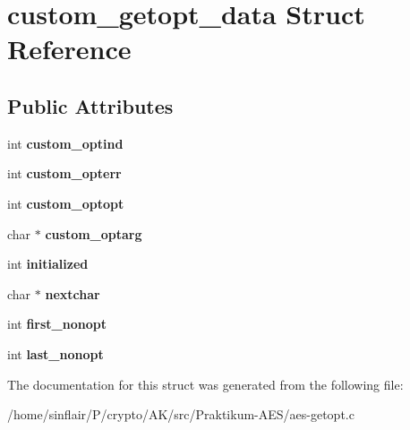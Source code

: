 \hypertarget{structcustom__getopt__data}{}\section{custom\+\_\+getopt\+\_\+data Struct Reference}
\label{structcustom__getopt__data}
\subsection*{Public Attributes}
\begin{DoxyCompactItemize}
\item 
\mbox{\label{structcustom__getopt__data_a708838699338a902634d6040f61c9d1e}} 
int {\bfseries custom\+\_\+optind}
\item 
\mbox{\label{structcustom__getopt__data_a70368029b9189c6af100d41b95a2a853}} 
int {\bfseries custom\+\_\+opterr}
\item 
\mbox{\label{structcustom__getopt__data_ad986661b4b79755fd55f9f10303221e0}} 
int {\bfseries custom\+\_\+optopt}
\item 
\mbox{\label{structcustom__getopt__data_a09e50973b9ce49fa0bfa62bb06289f32}} 
char $\ast$ {\bfseries custom\+\_\+optarg}
\item 
\mbox{\label{structcustom__getopt__data_a5952791becb49374ddfc8726bbf94910}} 
int {\bfseries initialized}
\item 
\mbox{\label{structcustom__getopt__data_a83f042e31dab41b17d8238b528e06121}} 
char $\ast$ {\bfseries nextchar}
\item 
\mbox{\label{structcustom__getopt__data_a89f56362160b74f59aa39d8838dd8bb8}} 
int {\bfseries first\+\_\+nonopt}
\item 
\mbox{\label{structcustom__getopt__data_aff78193409ca6ea017ced550453e0cfd}} 
int {\bfseries last\+\_\+nonopt}
\end{DoxyCompactItemize}


The documentation for this struct was generated from the following file\+:\begin{DoxyCompactItemize}
\item 
/home/sinflair/\+P/crypto/\+A\+K/src/\+Praktikum-\/\+A\+E\+S/aes-\/getopt.\+c\end{DoxyCompactItemize}
